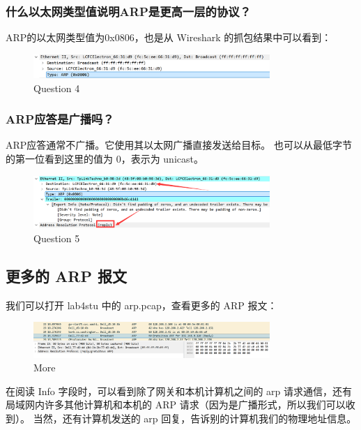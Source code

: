 \documentclass[14pt,a4paper,UTF8,twoside]{article}
\begin{document}
\subsubsection*{什么以太网类型值说明ARP是更高一层的协议？}
ARP的以太网类型值为0x0806，也是从 Wireshark 的抓包结果中可以看到：

\begin{figure}[H]
    \centering
    \includegraphics[width=0.8\textwidth]{lab4/q4.png}
    \caption{Question 4}
\end{figure}

\subsubsection*{ARP应答是广播吗？}
ARP应答通常不广播。它使用其以太网广播直接发送给目标。
也可以从最低字节的第一位看到这里的值为 0，表示为 unicast。

\begin{figure}[H]
    \centering
    \includegraphics[width=0.8\textwidth]{lab4/qf.png}
    \caption{Question 5}
\end{figure}

\subsection{更多的 ARP 报文}

我们可以打开 lab4stu 中的 arp.pcap，查看更多的 ARP 报文：

\begin{figure}[H]
    \centering
    \includegraphics[width=0.8\textwidth]{lab4/more.png}
    \caption{More}
\end{figure}

在阅读 Info 字段时，可以看到除了网关和本机计算机之间的 arp 请求通信，还有局域网内许多其他计算机和本机的 ARP 请求（因为是广播形式，所以我们可以收到）。
当然，还有计算机发送的 arp 回复，告诉别的计算机我们的物理地址信息。
\end{document}
